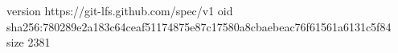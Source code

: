 version https://git-lfs.github.com/spec/v1
oid sha256:780289e2a183c64ceaf51174875e87c17580a8cbaebeac76f61561a6131c5f84
size 2381
